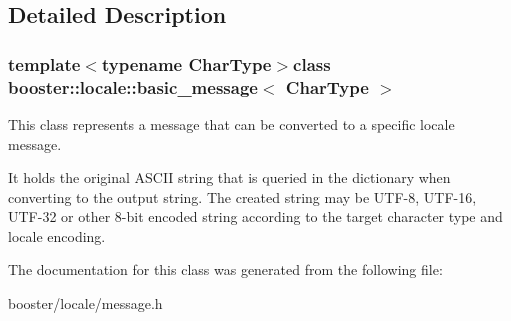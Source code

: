\subsection{Detailed Description}
\subsubsection*{template$<$typename Char\-Type$>$class booster\-::locale\-::basic\-\_\-message$<$ Char\-Type $>$}

This class represents a message that can be converted to a specific locale message. 

It holds the original A\-S\-C\-I\-I string that is queried in the dictionary when converting to the output string. The created string may be U\-T\-F-\/8, U\-T\-F-\/16, U\-T\-F-\/32 or other 8-\/bit encoded string according to the target character type and locale encoding. 

The documentation for this class was generated from the following file\-:\begin{DoxyCompactItemize}
\item 
booster/locale/message.\-h\end{DoxyCompactItemize}
